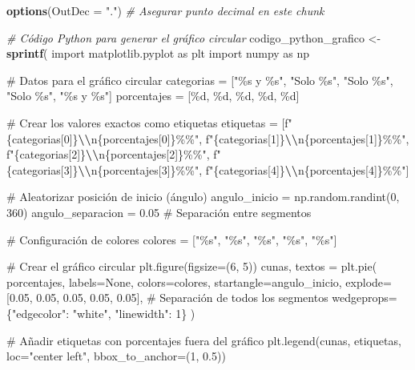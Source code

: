 \documentclass[
]{article}
\newenvironment{Shaded}{\begin{snugshade}}{\end{snugshade}}
\newcommand{\AttributeTok}[1]{\textcolor[rgb]{0.13,0.29,0.53}{#1}}
\newcommand{\CommentTok}[1]{\textcolor[rgb]{0.56,0.35,0.01}{\textit{#1}}}
\newcommand{\FunctionTok}[1]{\textcolor[rgb]{0.13,0.29,0.53}{\textbf{#1}}}
\newcommand{\NormalTok}[1]{#1}
\newcommand{\OtherTok}[1]{\textcolor[rgb]{0.56,0.35,0.01}{#1}}
\newcommand{\SpecialCharTok}[1]{\textcolor[rgb]{0.81,0.36,0.00}{\textbf{#1}}}
\newcommand{\StringTok}[1]{\textcolor[rgb]{0.31,0.60,0.02}{#1}}
\begin{document}
\begin{Shaded}
\begin{Highlighting}[]
\FunctionTok{options}\NormalTok{(}\AttributeTok{OutDec =} \StringTok{"."}\NormalTok{)  }\CommentTok{\# Asegurar punto decimal en este chunk}

\CommentTok{\# Código Python para generar el gráfico circular}
\NormalTok{codigo\_python\_grafico }\OtherTok{\textless{}{-}} \FunctionTok{sprintf}\NormalTok{(}
\StringTok{\textquotesingle{}}
\StringTok{import matplotlib.pyplot as plt}
\StringTok{import numpy as np}

\StringTok{\# Datos para el gráfico circular}
\StringTok{categorias = ["\%s y \%s", "Solo \%s", "Solo \%s", "Solo \%s", "\%s y \%s"]}
\StringTok{porcentajes = [\%d, \%d, \%d, \%d, \%d]}

\StringTok{\# Crear los valores exactos como etiquetas}
\StringTok{etiquetas = [f"\{categorias[0]\}}\SpecialCharTok{\textbackslash{}\textbackslash{}}\StringTok{n\{porcentajes[0]\}\%\%",}
\StringTok{            f"\{categorias[1]\}}\SpecialCharTok{\textbackslash{}\textbackslash{}}\StringTok{n\{porcentajes[1]\}\%\%",}
\StringTok{            f"\{categorias[2]\}}\SpecialCharTok{\textbackslash{}\textbackslash{}}\StringTok{n\{porcentajes[2]\}\%\%",}
\StringTok{            f"\{categorias[3]\}}\SpecialCharTok{\textbackslash{}\textbackslash{}}\StringTok{n\{porcentajes[3]\}\%\%",}
\StringTok{            f"\{categorias[4]\}}\SpecialCharTok{\textbackslash{}\textbackslash{}}\StringTok{n\{porcentajes[4]\}\%\%"]}

\StringTok{\# Aleatorizar posición de inicio (ángulo)}
\StringTok{angulo\_inicio = np.random.randint(0, 360)}
\StringTok{angulo\_separacion = 0.05  \# Separación entre segmentos}

\StringTok{\# Configuración de colores}
\StringTok{colores = ["\%s", "\%s", "\%s", "\%s", "\%s"]}

\StringTok{\# Crear el gráfico circular}
\StringTok{plt.figure(figsize=(6, 5))}
\StringTok{cunas, textos = plt.pie(}
\StringTok{    porcentajes,}
\StringTok{    labels=None,}
\StringTok{    colors=colores,}
\StringTok{    startangle=angulo\_inicio,}
\StringTok{    explode=[0.05, 0.05, 0.05, 0.05, 0.05],  \# Separación de todos los segmentos}
\StringTok{    wedgeprops=\{"edgecolor": "white", "linewidth": 1\}}
\StringTok{)}

\StringTok{\# Añadir etiquetas con porcentajes fuera del gráfico}
\StringTok{plt.legend(cunas, etiquetas, loc="center left", bbox\_to\_anchor=(1, 0.5))}


\end{Highlighting}
\end{Shaded}
\end{document}
